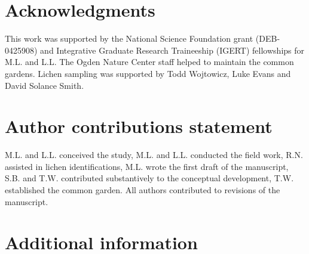 \documentclass[fleqn,10pt]{wlscirep}
\begin{document}
\section*{Acknowledgments} 

This work was supported by the National Science Foundation grant
(DEB-0425908) and Integrative Graduate Research Traineeship (IGERT)
fellowships for M.L. and L.L. The Ogden Nature Center staff helped to
maintain the common gardens. Lichen sampling was supported by Todd
Wojtowicz, Luke Evans and David Solance Smith.


\section*{Author contributions statement}

M.L. and L.L. conceived the study, M.L. and L.L. conducted the field
work, R.N.  assisted in lichen identifications, M.L. wrote the first
draft of the manuscript, S.B. and T.W. contributed substantively to
the conceptual development, T.W. established the common garden. All
authors contributed to revisions of the manuscript.

\section*{Additional information}




\clearpage
\newpage
\end{document}
